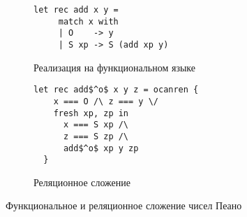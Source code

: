 
\begin{figure}[t]
  \begin{subfigure}[t]{0.5\textwidth}
  \begin{lstlisting}[language=ocanren,basicstyle=\small]
   let rec add x y =
     match x with
     | O    -> y
     | S xp -> S (add xp y)
  \end{lstlisting}
  \caption{Реализация на функциональном языке}
  \label{funadd}
  \end{subfigure}
  \begin{subfigure}[t]{0.5\textwidth}
    \begin{lstlisting}[language=ocanren,basicstyle=\small]
  let rec add$^o$ x y z = ocanren {
    x === O /\ z === y \/
    fresh xp, zp in
      x === S xp /\
      z === S zp /\
      add$^o$ xp y zp
  }
    \end{lstlisting}
    \caption{Реляционное сложение}
    \label{reladd}
  \end{subfigure}
  \caption{Функциональное и реляционное сложение чисел Пеано }
  \label{fun_vs_rel}
\end{figure}
